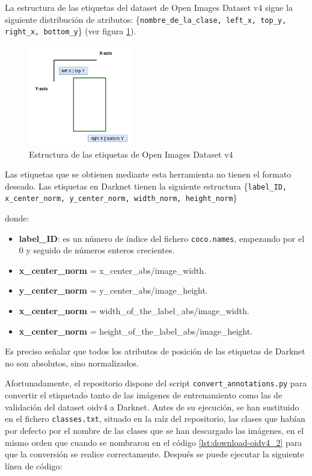 La estructura de las etiquetas del dataset de Open Images Dataset v4 sigue la siguiente distribución de atributos: \{\texttt{nombre\_de\_la\_clase, left\_x, top\_y, right\_x, bottom\_y}\} (ver figura \ref{fig:bbox-oidv4}).

\begin{figure}[ht]
\centering
\includegraphics[width=0.4\textwidth]{img/chapters/resultados/datasets/bbox-oidv4.png}
\caption{\label{fig:bbox-oidv4}Estructura de las etiquetas de Open Images Dataset v4 \cite{OIDv4_ToolKit}}
\end{figure}

Las etiquetas que se obtienen mediante esta herramienta no tienen el formato deseado. Las etiquetas en Darknet tienen la siguiente estructura \{\texttt{label\_ID, x\_center\_norm, y\_center\_norm, width\_norm, height\_norm}\}

donde:

\begin{itemize}
    \item \textbf{label\_ID}: es un número de índice del fichero \texttt{coco.names}, empezando por el 0 y seguido de números enteros crecientes.
    \item \textbf{x\_center\_norm} = x\_center\_abs/image\_width.
    \item \textbf{y\_center\_norm} = y\_center\_abs/image\_height.
    \item \textbf{x\_center\_norm} = width\_of\_the\_label\_abs/image\_width.
    \item \textbf{x\_center\_norm} = height\_of\_the\_label\_abs/image\_height.
\end{itemize}

Es preciso señalar que todos los atributos de posición de las etiquetas de Darknet no son absolutos, sino normalizados.

Afortunadamente, el repositorio \cite{OIDv4_ToolKit} dispone del script \texttt{convert\_annotations.py} para convertir el etiquetado tanto de las imágenes de entrenamiento como las de validación del dataset \gls{oidv4} a Darknet. Antes de su ejecución, se han sustituido en el fichero \texttt{classes.txt}, situado en la raíz del repositorio, las clases que habían por defecto por el nombre de las clases que se han descargado las imágenes, en el mismo orden que cuando se nombraron en el código \ref{lst:download-oidv4_2} para que la conversión se realice correctamente. Después se puede ejecutar la siguiente línea de código:

